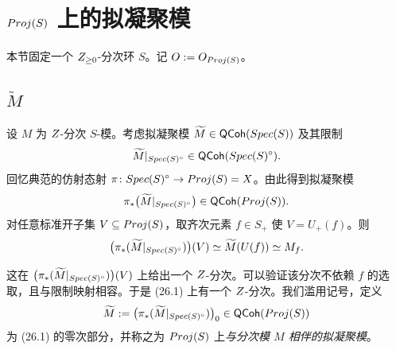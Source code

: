 
\providecommand{\QCoh}{\mathsf{QCoh}}
\providecommand{\Sym}{\operatorname{Sym}}
\providecommand{\Ann}{\operatorname{Ann}}
\makeatletter
{}
\makeatother

\section{$Proj(S)$ 上的拟凝聚模}\label{sec:26}

本节固定一个 $Z_{\ge 0}$-分次环 $S$。记 $O := O_{Proj(S)}$。

\subsection{$\widetilde{M}$}\label{sec:26.1}

\begin{construction}\label{con:26.1.1}
设 $M$ 为 $Z$-分次 $S$-模。考虑拟凝聚模 $\widetilde{M} \in \QCoh(\Spec(S))$ 及其限制
\[
\widetilde{M}|_{\Spec(S)^{\circ}} \in \QCoh(\Spec(S)^{\circ}).
\]
回忆典范的仿射态射 $\pi \colon Spec(S)^{\circ} \to Proj(S) = X$。由此得到拟凝聚模
\begin{equation}\label{eq:26.1}
\pi_*\bigl(\widetilde{M}|_{\Spec(S)^{\circ}}\bigr) \in \QCoh(\Proj(S)).
\end{equation}
对任意标准开子集 $V \subseteq Proj(S)$，取齐次元素 $f \in S_+$ 使 $V = U_+(f)$。则
\[
\bigl(\pi_*(\widetilde{M}|_{Spec(S)^{\circ}})\bigr)(V) \simeq \widetilde{M}(U(f)) \simeq M_f.
\]
\end{construction}

这在 $\bigl(\pi_*(\widetilde{M}|_{Spec(S)^{\circ}})\bigr)(V)$ 上给出一个 $Z$-分次。可以验证该分次不依赖 $f$ 的选取，且与限制映射相容。于是 (26.1) 上有一个 $Z$-分次。我们滥用记号，定义
\[
\widetilde{M} := \bigl(\pi_*(\widetilde{M}|_{\Spec(S)^{\circ}})\bigr)_0 \in \QCoh(\Proj(S))
\]
为 (26.1) 的零次部分，并称之为 $Proj(S)$ 上\emph{与分次模 $M$ 相伴的拟凝聚模}。

